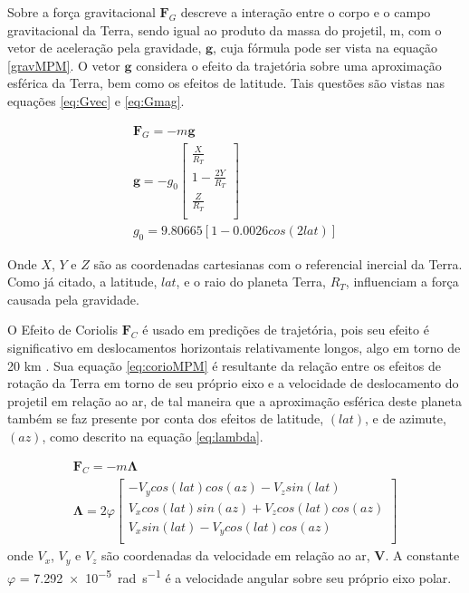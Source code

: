 Sobre a força gravitacional \(\boldsymbol{F}_{G}\) descreve a interação entre o corpo e o campo gravitacional da Terra, sendo igual ao produto da massa do projetil, m, com o vetor de aceleração pela gravidade, \(\boldsymbol{g}\), cuja fórmula pode ser vista na equação \ref{gravMPM}. O vetor \(\boldsymbol{g}\) considera o efeito da trajetória sobre uma aproximação esférica da Terra, bem como os efeitos de latitude. Tais questões são vistas nas equações \ref{eq:Gvec} e \ref{eq:Gmag}.

\begin{gather}
    \label{gravMPM}
    \boldsymbol{F}_{G} = -m\boldsymbol{g} \\
    \label{eq:Gvec}
    \boldsymbol{g} = -g_{0}\begin{bmatrix} 
        \frac{X}{R_{T}} \\
        1 - \frac{2Y}{R_{T}}\\
        \frac{Z}{R_{T}} \\
    \end{bmatrix} \\
    \label{eq:Gmag}
    g_{0} = \num{9,80665}[1 - \num{0,0026}cos(2lat)] 
\end{gather}

Onde \(X\), \(Y\) e \(Z\) são as coordenadas cartesianas com o referencial inercial da Terra. Como já citado, a latitude, \(lat\), e o raio do planeta Terra, \(R_{T}\), influenciam a força causada pela gravidade.

O Efeito de Coriolis \(\boldsymbol{F}_{C}\) é usado em predições de trajetória, pois seu efeito é significativo em deslocamentos horizontais relativamente longos, algo em torno de 20 km \cite{McCoy2012}. Sua equação \ref{eq:corioMPM} é resultante da relação entre os efeitos de rotação da Terra em torno de seu próprio eixo e a velocidade de deslocamento do projetil em relação ao ar, de tal maneira que a aproximação esférica deste planeta também se faz presente por conta dos efeitos de latitude, \(\left(lat\right)\), e de azimute, \(\left(az\right)\), como descrito na equação \ref{eq:lambda}.

\begin{gather}
\label{eq:corioMPM}
\boldsymbol{F}_{C} = -m\boldsymbol{\Lambda} \\
\label{eq:lambda}
\boldsymbol{\Lambda} = 2\varphi
\begin{bmatrix} 
    -V_{y}cos(lat)cos(az) - V_{z}sin(lat) \\
    V_{x}cos(lat)sin(az) + V_{z}cos(lat)cos(az)\\
    V_{x}sin(lat) - V_{y}cos(lat)cos(az) \\
\end{bmatrix}
\end{gather}
%
onde \(V_{x}\), \(V_{y}\) e \(V_{z}\) são coordenadas da velocidade em relação ao ar, \(\boldsymbol{V}\). A constante \(\varphi\) = \qty{7,292e-5}{\radian\per\second} é a velocidade angular sobre seu próprio eixo polar.

